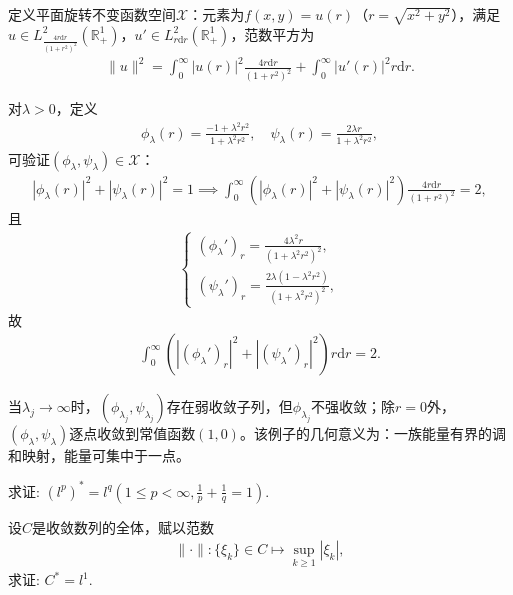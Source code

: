 \documentclass[../../main.tex]{subfiles}%
\begin{document}
\begin{example}[集中型弱收敛]

定义平面旋转不变函数空间$\mathscr{X}$：元素为$f(x,y)=u(r)$（$r=\sqrt{x^2+y^2}$），满足$u\in L^2_{\frac{4r\mathrm{d}r}{(1+r^2)^2}}(\mathbb{R}_+^1)$，$u'\in L^2_{r\mathrm{d}r}(\mathbb{R}_+^1)$，范数平方为
\begin{align*}
\|u\|^2=\int_{0}^{\infty}|u(r)|^2\frac{4r\mathrm{d}r}{(1+r^2)^2}+\int_{0}^{\infty}|u'(r)|^2r\mathrm{d}r.
\end{align*}

对$\lambda>0$，定义
\begin{align*}
\phi_\lambda(r)=\frac{-1+\lambda^2r^2}{1+\lambda^2r^2},\quad \psi_\lambda(r)=\frac{2\lambda r}{1+\lambda^2r^2},
\end{align*}
可验证$(\phi_\lambda,\psi_\lambda)\in\mathscr{X}$：
\begin{align*}
|\phi_\lambda(r)|^2+|\psi_\lambda(r)|^2=1\implies\int_{0}^{\infty}\left(|\phi_\lambda(r)|^2+|\psi_\lambda(r)|^2\right)\frac{4r\mathrm{d}r}{(1+r^2)^2}=2,
\end{align*}
且
\begin{align*}
\begin{cases}
(\phi_\lambda')_r=\frac{4\lambda^2r}{(1+\lambda^2r^2)^2},\\
(\psi_\lambda')_r=\frac{2\lambda(1-\lambda^2r^2)}{(1+\lambda^2r^2)^2},
\end{cases}
\end{align*}
故
\begin{align*}
\int_{0}^{\infty}\left(|(\phi_\lambda')_r|^2+|(\psi_\lambda')_r|^2\right)r\mathrm{d}r=2.
\end{align*}

当$\lambda_j\to\infty$时，$(\phi_{\lambda_j},\psi_{\lambda_j})$存在弱收敛子列，但$\phi_{\lambda_j}$不强收敛；除$r=0$外，$(\phi_\lambda,\psi_\lambda)$逐点收敛到常值函数$(1,0)$。该例子的几何意义为：一族能量有界的调和映射，能量可集中于一点。
\end{example}

\begin{example}
求证: $(l^p)^*=l^q \left(1\leqslant p<\infty,\frac{1}{p}+\frac{1}{q}=1\right)$.
\end{example}

\begin{example}
设$C$是收敛数列的全体，赋以范数
\begin{align*}
\|\cdot\|:\{\xi_k\}\in C\mapsto \sup\limits_{k\geqslant1}|\xi_k|,
\end{align*}
求证: $C^*=l^1$.
\end{example}
\end{document}

